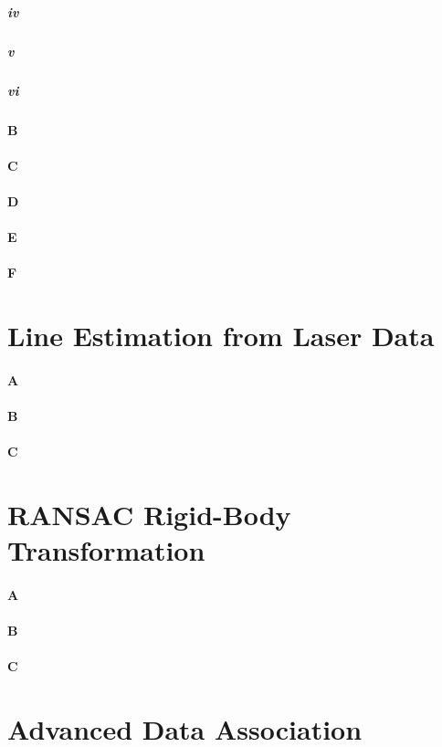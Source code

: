 \documentclass[12pt]{article}
\begin{document}
\subparagraph{iv}

\subparagraph{v}

\subparagraph{vi}

\paragraph{B}

\paragraph{C}

\paragraph{D}

\paragraph{E}

\paragraph{F}

\section{Line Estimation from Laser Data}

\paragraph{A}

\paragraph{B}

\paragraph{C}

\section{RANSAC Rigid-Body Transformation}

\paragraph{A}

\paragraph{B}

\paragraph{C}

\section{Advanced Data Association }
\end{document}

